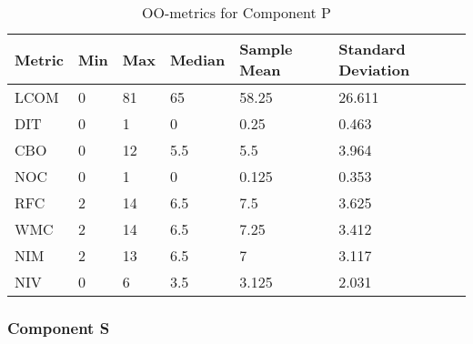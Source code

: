 \begin{table}[]
\centering
\caption{OO-metrics for Component P}
\label{tab:oometrics-proc}
\begin{tabular}{|l|l|l|l|l|l|}
\hline
\textbf{Metric} & \textbf{Min} & \textbf{Max} & \textbf{Median} & \textbf{Sample Mean} & \textbf{Standard Deviation} \\ \hline
LCOM            & 0            & 81           & 65              & 58.25                & 26.611                      \\ \hline
DIT             & 0            & 1            & 0               & 0.25                 & 0.463                       \\ \hline
CBO             & 0            & 12           & 5.5             & 5.5                  & 3.964                       \\ \hline
NOC             & 0            & 1            & 0               & 0.125                & 0.353                       \\ \hline
RFC             & 2            & 14           & 6.5             & 7.5                  & 3.625                       \\ \hline
WMC             & 2            & 14           & 6.5             & 7.25                 & 3.412                       \\ \hline
NIM             & 2            & 13           & 6.5             & 7                    & 3.117                       \\ \hline
NIV             & 0            & 6            & 3.5             & 3.125                & 2.031                       \\ \hline
\end{tabular}
\end{table}





\subsubsection{Component S}

